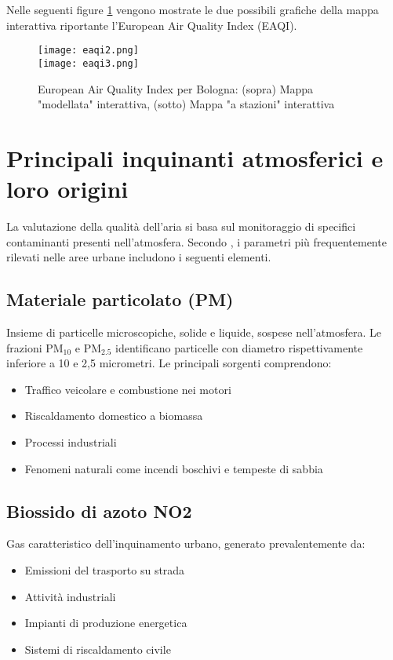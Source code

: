 Nelle seguenti figure \ref{fig:eaqi-combined} vengono mostrate le due possibili grafiche della mappa interattiva riportante l'European Air Quality Index (EAQI).

\begin{figure}[H]
  \centering
  \texttt{[image: eaqi2.png]}\\[1em]
  \texttt{[image: eaqi3.png]}
  \caption{European Air Quality Index per Bologna: (sopra) Mappa "modellata" interattiva, (sotto) Mappa "a stazioni" interattiva}
  \label{fig:eaqi-combined}
\end{figure}

\section{Principali inquinanti atmosferici e loro origini}

La valutazione della qualità dell'aria si basa sul monitoraggio di specifici contaminanti presenti nell'atmosfera.
Secondo \citet{GoogleMapsAirQuality2024}, i parametri più frequentemente rilevati nelle aree urbane includono i seguenti elementi.

\subsection{Materiale particolato (PM)}

Insieme di particelle microscopiche, solide e liquide, sospese nell'atmosfera.
Le frazioni PM$_{10}$ e PM$_{2.5}$ identificano particelle con diametro rispettivamente inferiore a 10 e 2,5 micrometri.
Le principali sorgenti comprendono:

\begin{itemize}
  \item Traffico veicolare e combustione nei motori
  \item Riscaldamento domestico a biomassa
  \item Processi industriali
  \item Fenomeni naturali come incendi boschivi e tempeste di sabbia
\end{itemize}

\subsection{Biossido di azoto NO2}

Gas caratteristico dell'inquinamento urbano, generato prevalentemente da:

\begin{itemize}
  \item Emissioni del trasporto su strada
  \item Attività industriali
  \item Impianti di produzione energetica
  \item Sistemi di riscaldamento civile
\end{itemize}


